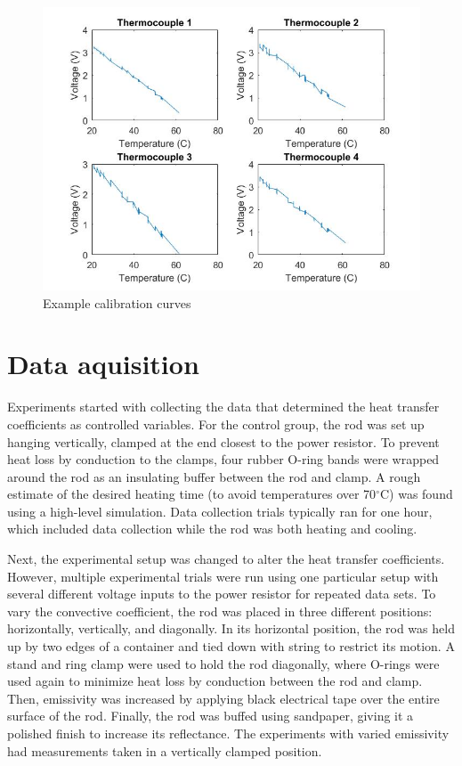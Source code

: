 \documentclass[letterpaper,titlepage,oneside]{report}
\begin{document}
\begin{figure}[ht]
  \centering
  \includegraphics[width=.75\textwidth]{calib}
  \caption{Example calibration curves}
  \label{fig:calib}
\end{figure}

\section{Data aquisition}
Experiments started with collecting the data that determined the
heat transfer coefficients as controlled variables. For the
control group, the rod was set up hanging vertically, clamped
at the end closest to the power resistor. To prevent heat loss
by conduction to the clamps, four rubber O-ring bands were
wrapped around the rod as an insulating buffer between the rod and
clamp. A rough estimate of the desired heating time (to avoid
temperatures over 70$^{\circ}$C) was found using a high-level
simulation. Data collection trials typically ran for one hour,
which included data collection while the rod was both heating and
cooling.

Next, the experimental setup was changed to alter the heat transfer
coefficients. However, multiple experimental trials were run
using one particular setup with several different voltage inputs
to the power resistor for repeated data sets. To vary the
convective coefficient, the rod was placed in three different
positions: horizontally, vertically, and diagonally. In its
horizontal position, the rod was held up by two edges of
a container and tied down with string to restrict its motion.
A stand and ring clamp were used to hold the rod diagonally,
where O-rings were used again to minimize heat loss by
conduction between the rod and clamp. Then, emissivity was
increased by applying black electrical tape over the entire
surface of the rod. Finally, the rod was buffed using sandpaper,
giving it a polished finish to increase its reflectance.
The experiments with varied emissivity had measurements taken in
a vertically clamped position.
\end{document}
